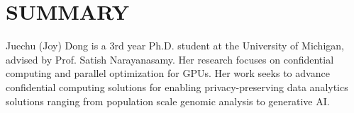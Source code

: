 \section{SUMMARY}
Juechu (Joy) Dong is a 3rd year Ph.D. student at the University of Michigan, advised by Prof. Satish Narayanasamy. 
Her research focuses on confidential computing and parallel optimization for GPUs. Her work seeks to advance confidential computing solutions for enabling privacy-preserving data analytics solutions ranging from population scale genomic analysis to generative AI. 